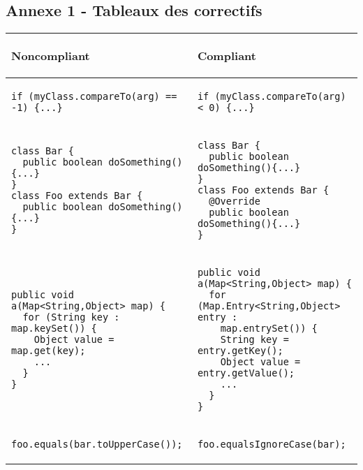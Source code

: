 \documentclass[a4paper]{article}
\begin{document}
\newpage
\appendix
\begin{center}
	\section{Annexe 1 - Tableaux des correctifs}
	\begin{tabular}{|p{}|p{}|}
  	\hline
	  	\begin{center}
	  	 Noncompliant
	  	 \end{center} & 
	  	 \begin{center}
	  	 Compliant
	  	 \end{center} \\
  	\hline
	\begin{lstlisting}
if (myClass.compareTo(arg) == -1) {...}
  	\end{lstlisting} 
   	& 
   	\begin{lstlisting}
if (myClass.compareTo(arg) < 0) {...}
  	\end{lstlisting}  \\
  	\hline
	\begin{lstlisting}
class Bar {
  public boolean doSomething(){...}
}
class Foo extends Bar {
  public boolean doSomething(){...}
}
  	\end{lstlisting} 
   	& 
   	\begin{lstlisting}
class Bar {
  public boolean doSomething(){...}
}
class Foo extends Bar {
  @Override
  public boolean doSomething(){...}
}
  	\end{lstlisting}  \\
  	\hline
	\begin{lstlisting}
public void a(Map<String,Object> map) {
  for (String key : map.keySet()) {  
    Object value = map.get(key);
    ...
  }
}
  	\end{lstlisting} 
   	& 
   	\begin{lstlisting}
public void a(Map<String,Object> map) {
  for (Map.Entry<String,Object> entry : 
  	map.entrySet()) {
    String key = entry.getKey();
    Object value = entry.getValue();
    ...
  }
}
  	\end{lstlisting}  \\
  	\hline
	\begin{lstlisting}
foo.equals(bar.toUpperCase());
  	\end{lstlisting} 
   	& 
   	\begin{lstlisting}
foo.equalsIgnoreCase(bar);  
  	\end{lstlisting}  \\

\end{tabular}
\end{center}
\end{document}
